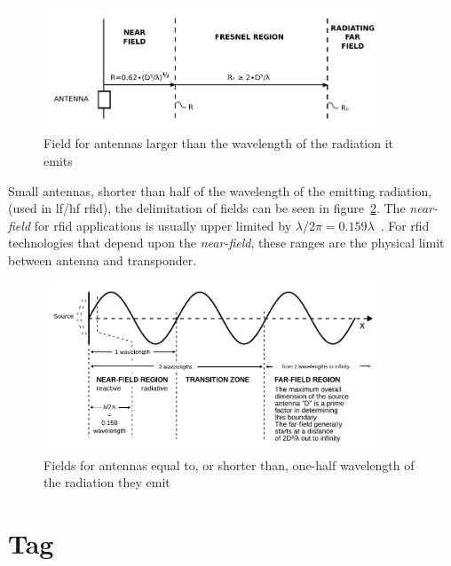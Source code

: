 \begin{figure}[!ht]
    \centering
    \includegraphics[width=0.9\textwidth]{./figs/02-state-of-the-art/FarNearFields-USP-4998112.pdf}
    \caption{Field for antennas larger than the wavelength of the radiation it emits~\cite{zerodamageFarFieldsVectorized1991}} 
    \label{fig:fieldregionsbigantenna}
\end{figure}

Small antennas, shorter than half of the wavelength of the emitting radiation, (used in \ac{lf}/\ac{hf} \ac{rfid}), the delimitation of fields can be seen in figure~\ref{fig:fieldregionsshortantenna}. The \emph{near-field} for \ac{rfid} applications is usually upper limited by $\lambda / 2\pi = 0.159\lambda$~\cite{nikitinOverviewFieldUHF2007a}. 
For \ac{rfid} technologies that depend upon the \emph{near-field}, these ranges are the physical limit between antenna and transponder.

\begin{figure}[!ht]
    \centering
    \includegraphics[width=0.9\textwidth]{./figs/02-state-of-the-art/Field_regions_for_typical_antennas_vector.pdf}
    \caption{Fields for antennas equal to, or shorter than, one-half wavelength of the radiation they emit~\cite{SafetyHealthTopics}} 
    \label{fig:fieldregionsshortantenna}
\end{figure}

\section{Tag} \label{sec:tag}

